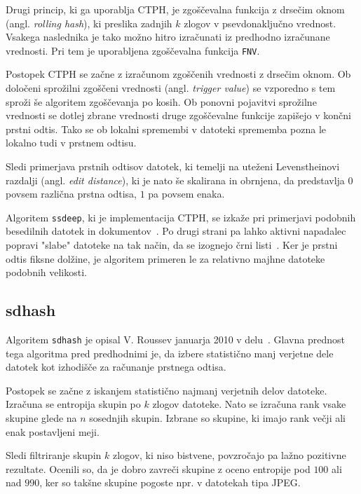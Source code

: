 \documentclass{acm_proc_article-sp}
\begin{document}
Drugi princip, ki ga uporablja CTPH, je zgoščevalna funkcija z drsečim oknom (angl. \emph{rolling hash}), ki preslika zadnjih $k$ zlogov v psevdonaključno vrednost. Vsakega naslednika je tako možno hitro izračunati iz predhodno izračunane vrednosti. Pri tem je uporabljena zgoščevalna funkcija \texttt{FNV}.

Postopek CTPH se začne z izračunom zgoščenih vrednosti z drsečim oknom. Ob določeni sprožilni zgoščeni vrednosti (angl. \emph{trigger value}) se vzporedno s tem sproži še algoritem zgoščevanja po kosih. Ob ponovni pojavitvi sprožilne vrednosti se dotlej zbrane vrednosti druge zgoščevalne funkcije zapišejo v končni prstni odtis.
Tako se ob lokalni spremembi v datoteki sprememba pozna le lokalno tudi v prstnem odtisu.

Sledi primerjava prstnih odtisov datotek, ki temelji na uteženi Levenstheinovi razdalji (angl. \emph{edit distance}), ki je nato še skalirana in obrnjena, da predstavlja $0$ povsem različna prstna odtisa, $1$ pa povsem enaka.

Algoritem \texttt{ssdeep}, ki je implementacija CTPH, se izkaže pri primerjavi podobnih besedilnih datotek in dokumentov~\cite{kornblum:ctph}. Po drugi strani pa lahko aktivni napadalec popravi "slabe" datoteke na tak način, da se izognejo črni listi~\cite{fbhash}. Ker je prstni odtis fiksne dolžine, je algoritem primeren le za relativno majhne datoteke podobnih velikosti.

\subsection{sdhash}
Algoritem \texttt{sdhash} je opisal V. Roussev januarja 2010 v delu~\cite{roussev:sdhash}. Glavna prednost tega algoritma pred predhodnimi je, da izbere statistično manj verjetne dele datotek kot izhodišče za računanje prstnega odtisa.

Postopek se začne z iskanjem statistično najmanj verjetnih delov datoteke. Izračuna se entropija skupin po $k$ zlogov datoteke. Nato se izračuna rank vsake skupine glede na $n$ sosednjih skupin. Izbrane so skupine, ki imajo rank večji ali enak postavljeni meji.

Sledi filtriranje skupin $k$ zlogov, ki niso bistvene, povzročajo pa lažno pozitivne rezultate. Ocenili so, da je dobro zavreči skupine z oceno entropije pod $100$ ali nad $990$, ker so takšne skupine pogoste npr. v datotekah tipa JPEG.
\end{document}
